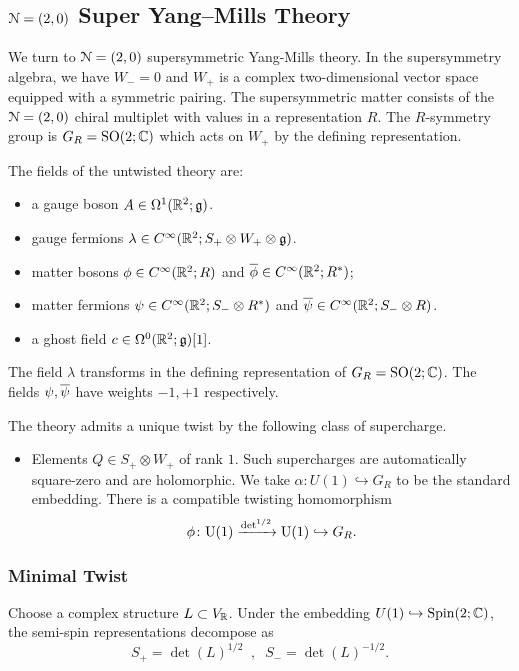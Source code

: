 \documentclass[10pt, oneside]{article}
\renewcommand{\U}{\mathrm{U}}
\begin{document}
\subsection{\texorpdfstring{$\cN=(2,0)$}{N=(2,0)} Super Yang--Mills Theory} \label{sect:2d(0,2)}

We turn to $\cN=(2,0)$ supersymmetric Yang-Mills theory.
In the supersymmetry algebra, we have $W_-=0$ and $W_+$ is a complex two-dimensional vector space equipped with a symmetric pairing. 
The supersymmetric matter consists of the $\cN = (2,0)$ chiral multiplet with values in a representation $R$. 
The $R$-symmetry group is $G_R = \SO(2;\CC)$ which acts on $W_+$ by the defining representation. 

The fields of the untwisted theory are:
\begin{itemize}
\item a gauge boson $A \in \Omega^1(\RR^2;\fg)$.
\item gauge fermions $\lambda \in C^\infty(\RR^2 ; S_+ \otimes W_+ \otimes \fg)$. 
\item matter bosons $\phi \in C^\infty(\RR^2 ; R)$ and $\Bar{\phi} \in C^\infty(\RR^2 ; R^*)$;
\item matter fermions $\psi \in C^\infty(\RR^2 ; S_- \otimes R^*)$  and $\Bar{\psi} \in C^\infty(\RR^2 ; S_- \otimes R)$.
\item a ghost field $c \in \Omega^0(\RR^2 ; \fg)[1]$.
\end{itemize}
The field $\lambda$ transforms in the defining representation of $G_R = \SO(2;\CC)$.
The fields $\psi, \Bar{\psi}$ have weights $-1,+1$ respectively.

The theory admits a unique twist by the following class of supercharge.
\begin{itemize}
\item Elements $Q \in S_+ \otimes W_+$ of rank $1$. 
Such supercharges are automatically square-zero and are holomorphic.
We take $\alpha \colon U(1) \hookrightarrow G_R$ to be the standard embedding.
There is a compatible twisting homomorphism
\[
\phi \colon \U(1) \xto{\det^{1/2}} \U(1) \hookrightarrow G_R .
\]
\end{itemize}

\subsubsection{Minimal Twist} \label{sect:2d02minimaltwist}

Choose a complex structure $L \subset V_\RR$. 
Under the embedding $U(1) \hookrightarrow \spin(2;\CC)$, the semi-spin representations decompose as
\[
S_+ = \det(L)^{1/2} \;\; , \;\; S_- = \det(L)^{-1/2} .
\]
\end{document}
